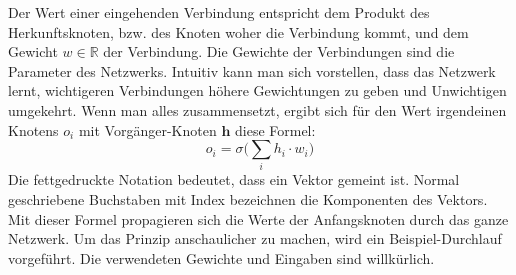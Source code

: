 Der Wert einer eingehenden Verbindung entspricht dem Produkt des Herkunftsknoten, bzw. des Knoten woher die Verbindung kommt, und dem Gewicht $w \in \mathbb{R}$ der Verbindung. Die Gewichte der Verbindungen sind die Parameter des Netzwerks. Intuitiv kann man sich vorstellen, dass das Netzwerk lernt, wichtigeren Verbindungen höhere Gewichtungen zu geben und Unwichtigen umgekehrt. Wenn man alles zusammensetzt, ergibt sich für den Wert irgendeinen Knotens $o_i$ mit Vorgänger-Knoten $\boldsymbol{h}$ diese Formel:
$$ o_i = \sigma\Big(\sum_i h_i \cdot w_{i}\Big)$$
Die fettgedruckte Notation bedeutet, dass ein Vektor gemeint ist. Normal geschriebene Buchstaben mit Index bezeichnen die Komponenten des Vektors. Mit dieser Formel propagieren sich die Werte der Anfangsknoten durch das ganze Netzwerk. Um das Prinzip anschaulicher zu machen, wird ein Beispiel-Durchlauf vorgeführt. Die verwendeten Gewichte und Eingaben sind willkürlich.

